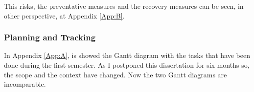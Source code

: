 This risks, the preventative measures and the recovery measures can be seen, in other perspective, at Appendix \ref{App:B}.

\subsubsection{Planning and Tracking}

In Appendix \ref{App:A}, is showed the Gantt diagram with the tasks that have been done during the first semester.
As I postponed this dissertation for six months so, the scope and the context have changed. Now the two Gantt diagrams are incomparable.



